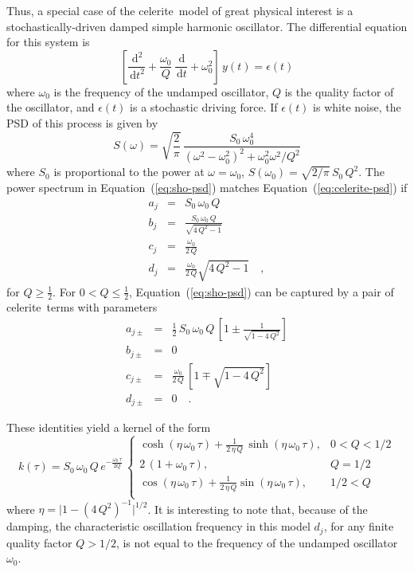 \documentclass[manuscript, letterpaper]{aastex6}
\newcommand{\project}[1]{\textsf{#1}}
\newcommand{\celerite}{\project{celerite}}
\renewcommand{\eqref}[1]{\ref{eq:#1}}
\newcommand{\Eq}[1]{Equation~(\eqref{#1})}
\newcommand{\eq}[1]{\Eq{#1}}
\newcommand{\eqlabel}[1]{\label{eq:#1}}
\newcommand{\dd}{\ensuremath{\,\mathrm{d}}}
\begin{document}
Thus, a special case of the \celerite\ model of great physical interest is a
stochastically-driven damped simple harmonic oscillator.
The differential equation for this system is
\begin{equation}
    \left[\frac{\dd^2}{\dd t^2} + \frac{\omega_0}{Q}\,\frac{\dd}{\dd t}
    + \omega_0^2\right]\, y(t) = \epsilon(t)
\end{equation}
where $\omega_0$ is the frequency of the undamped oscillator, $Q$ is the
quality factor of the oscillator, and $\epsilon(t)$ is a stochastic driving
force.
If $\epsilon(t)$ is white noise, the PSD of this process is given by
\citep[for example][]{Anderson:1990}
\begin{equation}\eqlabel{sho-psd}
S(\omega) = \sqrt{\frac{2}{\pi}}\,\frac{S_0\,\omega_0^4}
    {(\omega^2-\omega_0^2)^2 + \omega_0^2\omega^2/Q^2}
\end{equation}
where $S_0$ is proportional to the power at $\omega = \omega_0$, $S(\omega_0)
= \sqrt{2/\pi}\,S_0\,Q^2$.
The power spectrum in \eq{sho-psd} matches \eq{celerite-psd} if
\begin{eqnarray}\eqlabel{sho-complex}
a_j &=& S_0\,\omega_0\,Q \\
b_j &=& \frac{S_0\,\omega_0\,Q}{\sqrt{4\,Q^2-1}} \\
c_j &=& \frac{\omega_0}{2\,Q}\\
d_j &=& \frac{\omega_0}{2\,Q} \sqrt{4\,Q^2-1} \quad,
\end{eqnarray}
for $Q \ge \frac{1}{2}$.
For $0 < Q \le \frac{1}{2}$, \eq{sho-psd} can be captured by a pair of \celerite\
terms with parameters
\begin{eqnarray}\eqlabel{sho-real}
a_{j\pm} &=& \frac{1}{2}\,S_0\,\omega_0\,Q\,\left[ 1 \pm
        \frac{1}{\sqrt{1-4\,Q^2}}\right] \\
b_{j\pm} &=& 0 \nonumber\\
    c_{j\pm} &=& \frac{\omega_0}{2\,Q}\,\left[1 \mp \sqrt{1-4\,Q^2}\right]
    \nonumber\\
d_{j\pm} &=& 0 \quad. \nonumber
\end{eqnarray}

These identities yield a kernel of the form
\begin{equation}\eqlabel{sho-kernel}
k(\tau) = S_0\,\omega_0\,Q\,e^{-\frac{\omega_0\,\tau}{2Q}}\,
\begin{cases}
    \cosh{(\eta\,\omega_0\,\tau)} +
        \frac{1}{2\,\eta\,Q}\,\sinh{(\eta\,\omega_0\,\tau)}, & 0 < Q < 1/2\\
    2\,(1+\omega_0\,\tau), & Q = 1/2\\
    \cos{(\eta\,\omega_0\,\tau)} +
        \frac{1}{2\,\eta\,Q} \sin{(\eta\,\omega_0\,\tau)},& 1/2 < Q\\
\end{cases}
\end{equation}
where $\eta = \vert 1-(4\,Q^2)^{-1}\vert^{1/2}$.
It is interesting to note that, because of the damping, the characteristic
oscillation frequency in this model $d_j$, for any finite quality factor $Q > 1/2$,
is not equal to the frequency of the undamped oscillator $\omega_0$.
\end{document}
